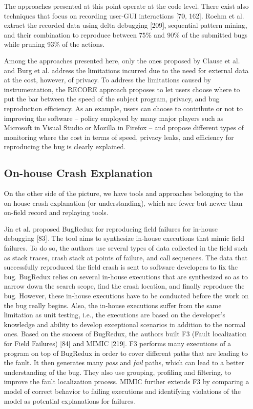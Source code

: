 \documentclass[12pt]{report}
\begin{document}
The approaches presented at this point operate at the code level. There
exist also techniques that focus on recording user-GUI interactions
{[}70, 162{]}. Roehm et al. extract the recorded data using delta
debugging {[}209{]}, sequential pattern mining, and their combination to
reproduce between 75\% and 90\% of the submitted bugs while pruning 93\%
of the actions.

Among the approaches presented here, only the ones proposed by Clause et
al. and Burg et al. address the limitations incurred due to the need for
external data at the cost, however, of privacy. To address the
limitations caused by instrumentation, the RECORE approach proposes to
let users choose where to put the bar between the speed of the subject
program, privacy, and bug reproduction efficiency. As an example, users
can choose to contribute or not to improving the software -- policy
employed by many major players such as Microsoft in Visual Studio or
Mozilla in Firefox -- and propose different types of monitoring where
the cost in terms of speed, privacy leaks, and efficiency for
reproducing the bug is clearly explained.

\subsection{On-house Crash
Explanation}\label{on-house-crash-explanation}

On the other side of the picture, we have tools and approaches belonging
to the on-house crash explanation (or understanding), which are fewer
but newer than on-field record and replaying tools.

Jin et al. proposed BugRedux for reproducing field failures for in-house
debugging {[}83{]}. The tool aims to synthesize in-house executions that
mimic field failures. To do so, the authors use several types of data
collected in the field such as stack traces, crash stack at points of
failure, and call sequences. The data that successfully reproduced the
field crash is sent to software developers to fix the bug. BugRedux
relies on several in-house executions that are synthesized so as to
narrow down the search scope, find the crash location, and finally
reproduce the bug. However, these in-house executions have to be
conducted before the work on the bug really begins. Also, the in-house
executions suffer from the same limitation as unit testing, i.e., the
executions are based on the developer's knowledge and ability to develop
exceptional scenarios in addition to the normal ones. Based on the
success of BugRedux, the authors built F3 (Fault localization for Field
Failures) {[}84{]} and MIMIC {[}219{]}. F3 performs many executions of a
program on top of BugRedux in order to cover different paths that are
leading to the fault. It then generates many \emph{pass} and \emph{fail}
paths, which can lead to a better understanding of the bug. They also
use grouping, profiling and filtering, to improve the fault localization
process. MIMIC further extends F3 by comparing a model of correct
behavior to failing executions and identifying violations of the model
as potential explanations for failures.
\end{document}

